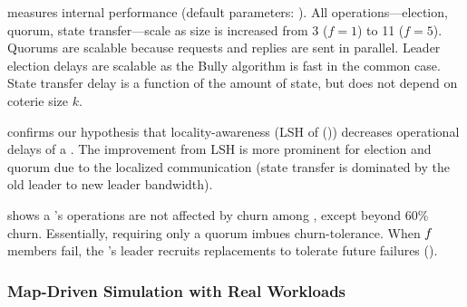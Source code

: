   measures \kgroup{} internal performance (default parameters:   ). All \kgroup{} operations---election, quorum,  state transfer---scale   as \kgroup{} size is increased from 3 ($f=1$) to 11 ($f=5$). Quorums are scalable because requests and replies are sent in parallel. Leader election delays are scalable as the Bully algorithm is fast in the common case.
State transfer delay is a function of the amount of state, but does not depend on coterie size $k$.

 confirms our hypothesis that locality-awareness (LSH of  ()) 
decreases operational delays of a \kgroup{}. The improvement from LSH is more prominent for election and quorum due to the localized communication (state transfer is dominated by the old leader to new leader bandwidth). 

 shows  a \kgroup's  operations are not 
affected by churn among \smarts, except beyond 60\% churn. Essentially, requiring only a quorum imbues churn-tolerance. When $f$ members fail, the \kgroup's leader recruits replacements to tolerate future failures (). 

\subsubsection{Map-Driven Simulation with Real Workloads}
\label{comesh:sec:mapsim}

